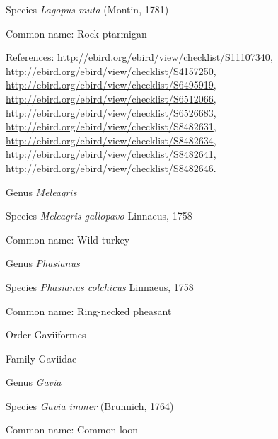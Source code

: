 \documentclass[9pt, article]{memoir}
\begin{document}
\begin{multicols}{2}
\vspace{6pt}\noindent\hspace{36pt}Species \textit{Lagopus muta} (Montin, 1781)


Common name: Rock ptarmigan

References: 
\url{http://ebird.org/ebird/view/checklist/S11107340}, 
\url{http://ebird.org/ebird/view/checklist/S4157250}, 
\url{http://ebird.org/ebird/view/checklist/S6495919}, 
\url{http://ebird.org/ebird/view/checklist/S6512066}, 
\url{http://ebird.org/ebird/view/checklist/S6526683}, 
\url{http://ebird.org/ebird/view/checklist/S8482631}, 
\url{http://ebird.org/ebird/view/checklist/S8482634}, 
\url{http://ebird.org/ebird/view/checklist/S8482641}, 
\url{http://ebird.org/ebird/view/checklist/S8482646}.

\vspace{6pt}\noindent\hspace{30pt}Genus \textit{Meleagris}


\vspace{6pt}\noindent\hspace{36pt}Species \textit{Meleagris gallopavo} Linnaeus, 1758


Common name: Wild turkey

\vspace{6pt}\noindent\hspace{30pt}Genus \textit{Phasianus}


\vspace{6pt}\noindent\hspace{36pt}Species \textit{Phasianus colchicus} Linnaeus, 1758


Common name: Ring-necked pheasant

\vspace{6pt}\noindent\hspace{18pt}Order Gaviiformes


\vspace{6pt}\noindent\hspace{24pt}Family Gaviidae


\vspace{6pt}\noindent\hspace{30pt}Genus \textit{Gavia}


\vspace{6pt}\noindent\hspace{36pt}Species \textit{Gavia immer} (Brunnich, 1764)


Common name: Common loon


\end{multicols}
\end{document}
